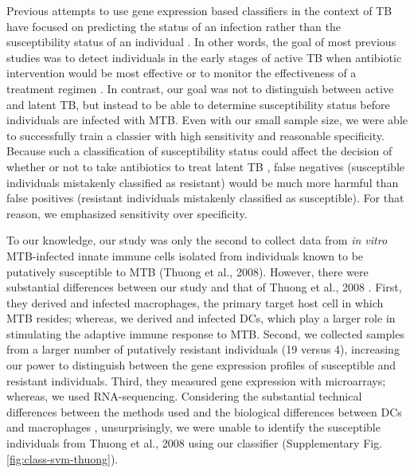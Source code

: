 \documentclass[fleqn,10pt]{wlscirep}
\begin{document}
Previous attempts to use gene expression based classifiers in the
context of TB have focused on predicting the status of an infection
rather than the susceptibility status of an individual
\cite{Berry2010, OGarra2013, Blankley2014}. In other words, the goal
of most previous studies was to detect individuals in the early stages
of active TB when antibiotic intervention would be most effective or
to monitor the effectiveness of a treatment regimen
\cite{Maertzdorf2015}. In contrast, our goal was not to distinguish
between active and latent TB, but instead to be able to determine
susceptibility status before individuals are infected with MTB. Even
with our small sample size, we were able to successfully train a
classier with high sensitivity and reasonable specificity. Because
such a classification of susceptibility status could affect the
decision of whether or not to take antibiotics to treat latent TB
\cite{Munoz2015}, false negatives (susceptible individuals mistakenly
classified as resistant) would be much more harmful than false
positives (resistant individuals mistakenly classified as
susceptible). For that reason, we emphasized sensitivity over
specificity.

To our knowledge, our study was only the second to collect data from
\emph{in vitro} MTB-infected innate immune cells isolated from
individuals known to be putatively susceptible to MTB (Thuong et al.,
2008). However, there were substantial differences between our study
and that of Thuong et al., 2008 \cite{Thuong2008}. First, they derived
and infected macrophages, the primary target host cell in which MTB
resides; whereas, we derived and infected DCs, which play a larger
role in stimulating the adaptive immune response to MTB. Second, we
collected samples from a larger number of putatively resistant
individuals (19 versus 4), increasing our power to distinguish between
the gene expression profiles of susceptible and resistant individuals.
Third, they measured gene expression with microarrays; whereas, we
used RNA-sequencing. Considering the substantial technical differences
between the methods used and the biological differences between DCs
and macrophages \cite{Chaussabel2003,Tailleux2008}, unsurprisingly, we
were unable to identify the susceptible individuals from Thuong et
al., 2008 \cite{Thuong2008} using our classifier (Supplementary Fig.
\ref{fig:class-svm-thuong}).
\end{document}
